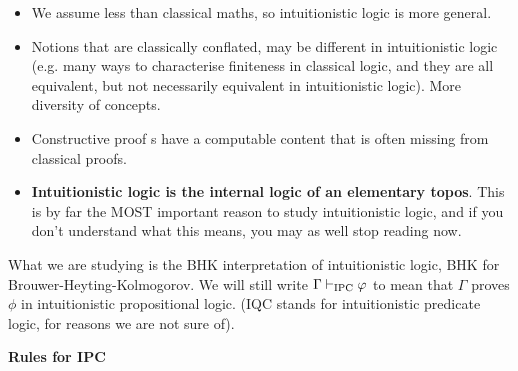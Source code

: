 \documentclass{article}
\numberwithin{thm}{subsection}
\begin{document}
\begin{itemize}
    \item We assume less than classical maths, so intuitionistic logic is more general.
    \item Notions that are classically conflated, may be different in intuitionistic logic (e.g. many ways to characterise finiteness in classical logic, and they are all equivalent, but not necessarily equivalent in intuitionistic logic). More diversity of concepts.
    \item Constructive proof s have a computable content that is often missing from classical proofs.
    \item \large \textbf{Intuitionistic logic is the internal logic of an elementary topos}. \normalsize \gap This is by far the MOST important reason to study intuitionistic logic, and if you don't understand what this means, you may as well stop reading now.
\end{itemize}
What we are studying is the BHK interpretation of intuitionistic logic, BHK for Brouwer-Heyting-Kolmogorov.\gap
We will \newlec still write $\Gamma \vdash_{\text{IPC}} \varphi$ to mean that $\Gamma$ proves $\phi$ in intuitionistic propositional logic. (IQC stands for intuitionistic predicate logic, for reasons we are not sure of).
\large
\begin{center}
\textbf{Rules for IPC}
\end{center}\normalsize
\end{document}
